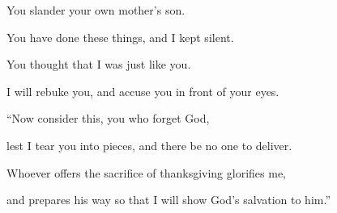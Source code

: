 {\par }{\QB You slander your own mother’s son.
\par }{\Q {}You have done these things, and I kept silent.
\par }{\QB You thought that I was just like you.
\par }{\QB I will rebuke you, and accuse you in front of your eyes.
\par }{\BB \par }{\Q {}“Now consider this, you who forget God,
\par }{\QB lest I tear you into pieces, and there be no one to deliver.
\par }{\Q {}Whoever offers the sacrifice of thanksgiving glorifies me,
\par }{\QB and prepares his way so that I will show God’s salvation to him.”

}
